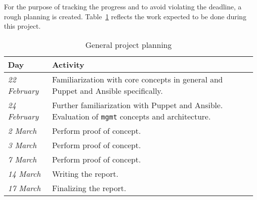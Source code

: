 For the purpose of tracking the progress and to avoid violating the deadline, a rough planning is created. Table~\ref{tab:planning} reflects the work expected to be done during this project. 

\begin{table}[!h]
\centering
\begin{tabular}{ll}
\toprule
\textbf{Day}         & \textbf{Activity} \\ \midrule
\textit{22 February} & Familiarization with core concepts in general and Puppet and Ansible specifically. \\
\textit{24 February} & Further familiarization with Puppet and Ansible. Evaluation of \texttt{mgmt} concepts and architecture. \\
\textit{2 March}     & Perform proof of concept. \\
\textit{3 March}     & Perform proof of concept. \\
\textit{7 March}     & Perform proof of concept. \\
\textit{14 March}    & Writing the report. \\ 
\textit{17 March}    & Finalizing the report. \\\bottomrule
\end{tabular}
\caption{General project planning}
\label{tab:planning}
\end{table} 




